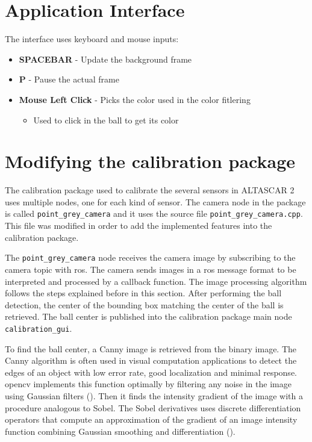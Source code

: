 \section{Application Interface}

The interface uses keyboard and mouse inputs:

\begin{itemize}
	\item \textbf{SPACEBAR} - Update the background frame
	\item \textbf{P} - Pause the actual frame
	\item \textbf{Mouse Left Click} - Picks the color used in the color fitlering
	\begin{itemize}
	\item Used to click in the ball to get its color
	\end{itemize}
\end{itemize}

\section{Modifying the calibration package}

The calibration package used to calibrate the several sensors in ALTASCAR 2 uses multiple nodes, one for each kind of sensor. The camera node in the package is called \texttt{point\_grey\_camera} and it uses the source file \texttt{point\_grey\_camera.cpp}. This file was modified in order to add the implemented features into the calibration package. 

The \texttt{point\_grey\_camera} node receives the camera image by subscribing to the camera topic with \gls{ros}. The camera sends images in a \gls{ros} message format to be interpreted and processed by a callback function. The image processing algorithm follows the steps explained before in this section. After performing the ball detection, the center of the bounding box matching the center of the ball is retrieved. The ball center is published into the calibration package main node \texttt{calibration\_gui}.

To find the ball center, a Canny image is retrieved from the binary image. The Canny algorithm is often used in visual computation applications to detect the edges of an object with low error rate, good localization and minimal response. \gls{opencv} implements this function optimally by filtering any noise in the image using Gaussian filters (\cite{OpenCV2.4.13.6documentationa}). Then it finds the intensity gradient of the image with a procedure analogous to Sobel. The Sobel derivatives uses discrete differentiation operators that compute an approximation of the gradient of an image intensity function combining Gaussian smoothing and differentiation (\cite{OpenCV2.4.13.6documentationb}). 

